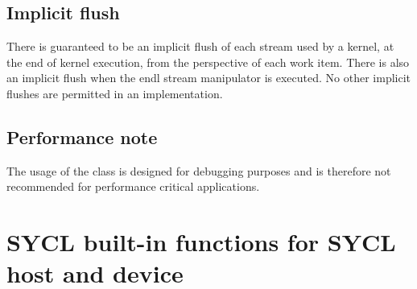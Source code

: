 \subsection{Implicit flush}
There is guaranteed to be an implicit flush of each stream used by a kernel, at the end of kernel execution, from the perspective of each work item.  There is also an implicit flush when the endl stream manipulator is executed.  No other implicit flushes are permitted in an implementation. 

\subsection{Performance note}

The usage of the  class is designed for debugging purposes and is therefore not recommended for performance critical applications.

\section{SYCL built-in functions for SYCL host and device}
\label{sycl:builtins}



